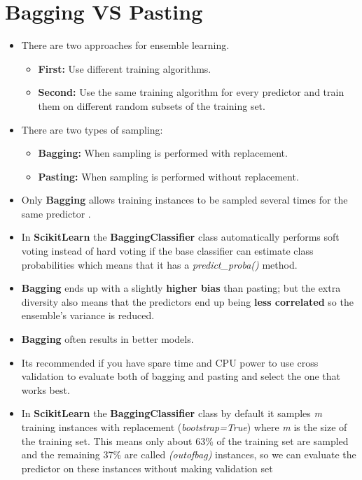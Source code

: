 \documentclass{article}
\begin{document}
    \section{Bagging VS Pasting} 
    \begin{itemize}
    	\item There are two approaches for ensemble learning.
    	\begin{itemize}
    		\item \textbf{First:} Use different training algorithms.
    		\item \textbf{Second:} Use the same training algorithm for every predictor and train them on different random subsets of the training set.
    	\end{itemize}
	    \item There are two types of sampling:
	    \begin{itemize}
			\item \textbf{Bagging:} When sampling is performed with replacement.
	   		\item \textbf{Pasting:} When sampling is performed without replacement. 
	    \end{itemize}
    	\item Only \textbf{Bagging} allows training instances to be sampled several times for the same predictor .
    	\item In \textbf{Scikit\textendash Learn} the \textbf{BaggingClassifier} class automatically performs soft voting instead of hard voting if the base classifier can estimate class probabilities which means that it has a \textit{predict\_proba()} method.
    	\item \textbf{Bagging} ends up with a slightly \textbf{higher bias} than pasting; but the extra diversity also means that the predictors end up being \textbf{less correlated} so the ensemble's variance is reduced.
    	\item \textbf{Bagging} often results in better models.
    	\item Its recommended if you have spare time and CPU power to use cross validation to evaluate both of bagging and pasting and select the one that works best.
    	\item In \textbf{Scikit\textendash Learn} the \textbf{BaggingClassifier} class by default it samples \textit{m} training instances with replacement (\textit{bootstrap=True}) where \textit{m} is the size of the training set. This means only about 63\% of the training set are sampled and the remaining 37\% are called \textit{(out\textendash of\textendash bag)} instances, so we can evaluate the predictor on these instances without making validation set
    	

\end{itemize}
\end{document}
